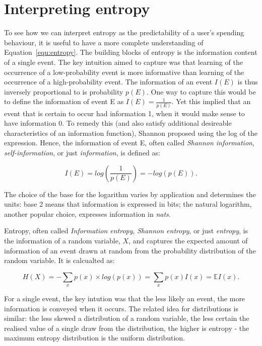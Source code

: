 
\section{Interpreting entropy}%
\label{sec:interpreting_entropy}

To see how we can interpret entropy as the predictability of a user's spending behaviour, it is useful to have a more complete
understanding of Equation~\ref{equ:entropy}. The building blocks of entropy is
the information content of a single event. The key intuition
\citet{shannon1948mathematical} aimed to capture was that learning of the
occurrence of a low-probability event is more informative than learning of the
occurrence of a high-probability event. The information of an event $I(E)$ is
thus inversely proportional to is probability $p(E)$. One way to capture this
would be to define the information of event E as $I(E) = \frac{1}{p(E)}$. Yet
this implied that an event that is certain to occur had information 1, when it
would make sense to have information 0. To remedy this (and also satisfy
additional desireable characteristics of an information function), Shannon
proposed using the log of the expression. Hence, the information of event E,
often called \textit{Shannon information}, \textit{self-information}, or just
\textit{information}, is defined as:

\begin{equation}
    I(E) = log\left(\frac{1}{p(E)}\right) = -log(p(E)).
\end{equation}

The choice of the base for the logarithm varies by application and determines
the units: base 2 means that information is expressed in bits; the natural
logarithm, another popular choice, expresses information in \textit{nats}.

Entropy, often called \textit{Information entropy}, \textit{Shannon entropy},
or just \textit{entropy}, is the information of a random variable, $X$, and
captures the expected amount of information of an event drawn at random from
the probability distribution of the random variable. It is calcualted as:

\begin{equation}
    H(X) = -\sum_x p(x) \times log(p(x)) = \sum_x p(x)I(x) = \mathbb{E} I(x).
\end{equation}

For a single event, the key intution was that the less likely an event, the
more information is conveyed when it occurs. The related idea for distributions
is similar: the less skewed a distribution of a random variable, the less
certain the realised value of a single draw from the distribution, the higher
is entropy - the maximum entropy distribution is the uniform distribution.


